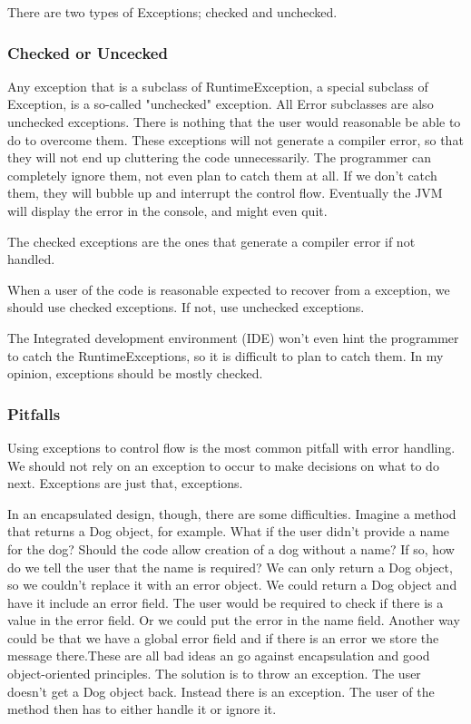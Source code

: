 There are two types of Exceptions; checked and unchecked.

\subsubsection{Checked or Uncecked}
Any exception that is a subclass of RuntimeException, a special subclass of Exception, is a so-called "unchecked" exception. All Error subclasses are also unchecked exceptions. There is nothing that the user would reasonable be able to do to overcome them. These exceptions will not generate a compiler error, so that they will not end up cluttering the code unnecessarily. The programmer can completely ignore them, not even plan to catch them at all. \cite{runtimeexception} If we don't catch them, they will bubble up and interrupt the control flow. Eventually the JVM will display the error in the console, and might even quit.

The checked exceptions are the ones that generate a compiler error if not handled.

When a user of the code is reasonable expected to recover from a exception, we should use checked exceptions. If not, use unchecked exceptions.\cite{runtimeexception}

The Integrated development environment (IDE) won't even hint the programmer to catch the RuntimeExceptions, so it is difficult to plan to catch them. In my opinion, exceptions should be mostly checked.

\subsubsection{Pitfalls}

Using exceptions to control flow is the most common pitfall with error handling. We should not rely on an exception to occur to make decisions on what to do next. Exceptions are just that, exceptions.

In an encapsulated design, though, there are some difficulties. Imagine a method that returns a Dog object, for example. What if the user didn't provide a name for the dog? Should the code allow creation of a dog without a name? If so, how do we tell the user that the name is required? We can only return a Dog object, so we couldn't replace it with an error object. We could return a Dog object and have it include an error field. The user would be required to check if there is a value in the error field. Or we could put the error in the name field. Another way could be that we have a global error field and if there is an error we store the message there.These are all bad ideas an go against encapsulation and good object-oriented principles. The solution is to throw an exception. The user doesn't get a Dog object back. Instead there is an exception. The user of the method then has to either handle it or ignore it.

